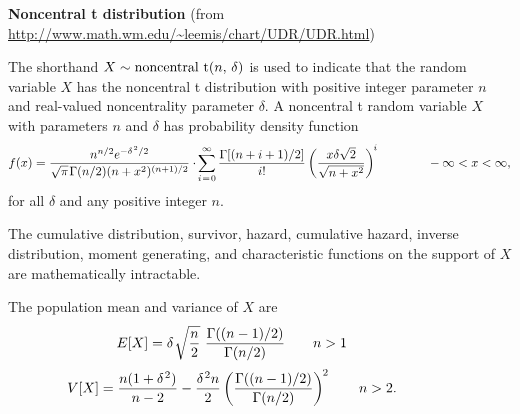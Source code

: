 \documentclass[12pt,fullpage]{article}
\begin{document}
\noindent
{\bf Noncentral t distribution} (from \color{blue}\url{http://www.math.wm.edu/~leemis/chart/UDR/UDR.html}\color{black})

\noindent
The shorthand $X \sim {\rm noncentral\ t}(n,\, \delta)$ is used to indicate that the
random variable $X$ has the noncentral t distribution with positive integer
parameter $n$ and real-valued noncentrality parameter $\delta$.
A noncentral t random variable $X$ with parameters $n$ and $\delta$ has probability density function 
$$
f(x) = \frac{n ^ {n / 2} e ^ {-\delta ^ {\kern 0.08 em 2} / 2}}{\sqrt{\pi} \kern 0.08 em \Gamma(n / 2)(n + x ^ 2) ^ {(n + 1) / 2}} \cdot \kern -0.08 em
\displaystyle\sum_{i \kern 0.08 em = \kern 0.08 em 0} ^ {\infty} \frac{\Gamma[(n + i + 1) / 2]} {i!} \left(\frac{x \delta \sqrt{2}}{\sqrt{n + x ^ 2}} \right) ^ {\kern -0.08 em i} 
\qquad \qquad -\infty < x < \infty,
$$
for all $\delta$ and any positive integer $n$.

\vspace{0.1in}
\noindent
The cumulative distribution, survivor, hazard, 
cumulative hazard, inverse distribution, moment generating, and characteristic functions on the support 
of $X$ are mathematically intractable.

\vspace{0.1in}
\noindent
The population mean and variance of $X$ are 
$$
E[X] = \delta \kern 0.08 em \sqrt{\frac{n} {2}} \ \frac{\Gamma((n - 1) / 2)} {\Gamma(n / 2)} \qquad n > 1 \qquad \qquad 
$$
$$
V[X] = \frac{n (1 + \delta ^ {\kern 0.08 em 2})} {n - 2} - \frac{\delta ^ {\kern 0.08 em 2} n} {2} \left(\frac{\Gamma((n - 1) / 2)} {\Gamma(n / 2)} \right) ^ {\kern -0.08 em 2} \qquad  n > 2. \qquad \qquad 
$$


\end{document}
